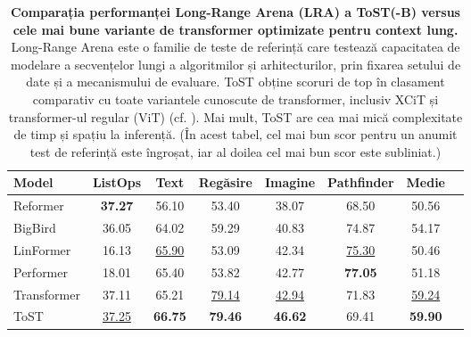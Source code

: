 \documentclass[../../book-main_ro.tex]{subfiles}
\begin{document}
\begin{table}
    \centering
    
    \begin{tabular}{@{}lccccccc@{}}
            \toprule
            Model        & ListOps  & Text     & Regăsire & Imagine    & Pathfinder & Medie      \\
            \midrule
            \midrule
            Reformer              & \textbf{37.27} & 56.10             & 53.40              & 38.07             & 68.50               & 50.56             \\
            BigBird               & 36.05             & 64.02             & 59.29              & 40.83             & 74.87                & 54.17             \\
            LinFormer         & 16.13             & \underline{65.90} & 53.09              & 42.34             & \underline{75.30}               & 50.46             \\
            Performer             & 18.01             & 65.40             & 53.82              & 42.77             & \textbf{77.05}                & 51.18             \\
            Transformer           & 37.11             & 65.21             & \underline{79.14}              & \underline{42.94}             & 71.83              & \underline{59.24}            \\
            ToST & \underline{37.25}    & \textbf{66.75}    & \textbf{79.46}     & \textbf{46.62}    &    69.41      &     \textbf{59.90}\\
            
            \bottomrule
        \end{tabular}%
    \caption{\small \textbf{Comparația performanței Long-Range Arena (LRA) a ToST(-B) versus cele mai bune variante de transformer optimizate pentru context lung.} Long-Range Arena este o familie de teste de referință care testează capacitatea de modelare a secvențelor lungi a algoritmilor și arhitecturilor, prin fixarea setului de date și a mecanismului de evaluare. ToST obține scoruri de top în clasament comparativ cu toate variantele cunoscute de transformer, inclusiv XCiT și transformer-ul regular (ViT) (cf. ). Mai mult, ToST are cea mai mică complexitate de timp și spațiu la inferență. (În acest tabel, cel mai bun scor pentru un anumit test de referință este îngroșat, iar al doilea cel mai bun scor este subliniat.)}
    \label{tab:tost_lra_results}
\end{table}
\end{document}
